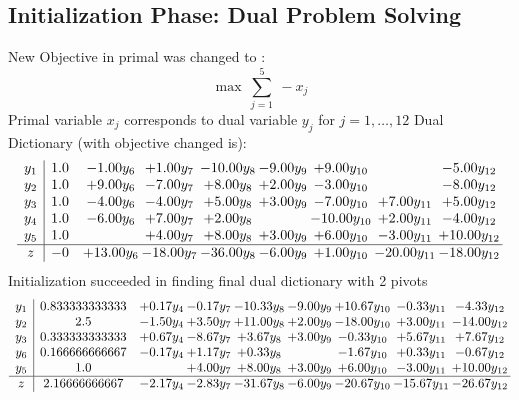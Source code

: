 \documentclass[8pt]{article}
\begin{document}
\subsection{Initialization Phase: Dual Problem Solving}
New Objective in primal was changed to : \[ \max\ \sum_{j=1}^{5}\ - x_j \] 
Primal variable $x_j$ corresponds to dual variable $y_j$ for $j = 1,\ldots,12$
Dual Dictionary (with objective changed is): 
\[\begin{array}{c| c c@{\hskip 2pt} c@{\hskip 2pt} c@{\hskip 2pt} c@{\hskip 2pt} c@{\hskip 2pt} c@{\hskip 2pt} c@{\hskip 2pt} }
 y_{1}   &  1.0 & -1.00 y_{6} & +  1.00 y_{7} & -10.00 y_{8} & -9.00 y_{9} & +  9.00 y_{10} &   & -5.00 y_{12}\\
 y_{2}   &  1.0 & +  9.00 y_{6} & -7.00 y_{7} & +  8.00 y_{8} & +  2.00 y_{9} & -3.00 y_{10} &   & -8.00 y_{12}\\
 y_{3}   &  1.0 & -4.00 y_{6} & -4.00 y_{7} & +  5.00 y_{8} & +  3.00 y_{9} & -7.00 y_{10} & +  7.00 y_{11} & +  5.00 y_{12}\\
 y_{4}   &  1.0 & -6.00 y_{6} & +  7.00 y_{7} & +  2.00 y_{8} &   & -10.00 y_{10} & +  2.00 y_{11} & -4.00 y_{12}\\
 y_{5}   &  1.0  &   & +  4.00 y_{7} & +  8.00 y_{8} & +  3.00 y_{9} & +  6.00 y_{10} & -3.00 y_{11} & + 10.00 y_{12}\\
\hline
z    &  -0 & + 13.00 y_{6} & -18.00 y_{7} & -36.00 y_{8} & -6.00 y_{9} & +  1.00 y_{10} & -20.00 y_{11} & -18.00 y_{12}\\
\end{array}\]
Initialization succeeded in finding final dual dictionary with 2 pivots
\[\begin{array}{c| c c@{\hskip 2pt} c@{\hskip 2pt} c@{\hskip 2pt} c@{\hskip 2pt} c@{\hskip 2pt} c@{\hskip 2pt} c@{\hskip 2pt} }
 y_{1}   &  0.833333333333 & +  0.17 y_{4} & -0.17 y_{7} & -10.33 y_{8} & -9.00 y_{9} & + 10.67 y_{10} & -0.33 y_{11} & -4.33 y_{12}\\
 y_{2}   &  2.5 & -1.50 y_{4} & +  3.50 y_{7} & + 11.00 y_{8} & +  2.00 y_{9} & -18.00 y_{10} & +  3.00 y_{11} & -14.00 y_{12}\\
 y_{3}   &  0.333333333333 & +  0.67 y_{4} & -8.67 y_{7} & +  3.67 y_{8} & +  3.00 y_{9} & -0.33 y_{10} & +  5.67 y_{11} & +  7.67 y_{12}\\
 y_{6}   &  0.166666666667 & -0.17 y_{4} & +  1.17 y_{7} & +  0.33 y_{8} &   & -1.67 y_{10} & +  0.33 y_{11} & -0.67 y_{12}\\
 y_{5}   &  1.0  &   & +  4.00 y_{7} & +  8.00 y_{8} & +  3.00 y_{9} & +  6.00 y_{10} & -3.00 y_{11} & + 10.00 y_{12}\\
\hline
z    &  2.16666666667 & -2.17 y_{4} & -2.83 y_{7} & -31.67 y_{8} & -6.00 y_{9} & -20.67 y_{10} & -15.67 y_{11} & -26.67 y_{12}\\
\end{array}\]
\end{document}
